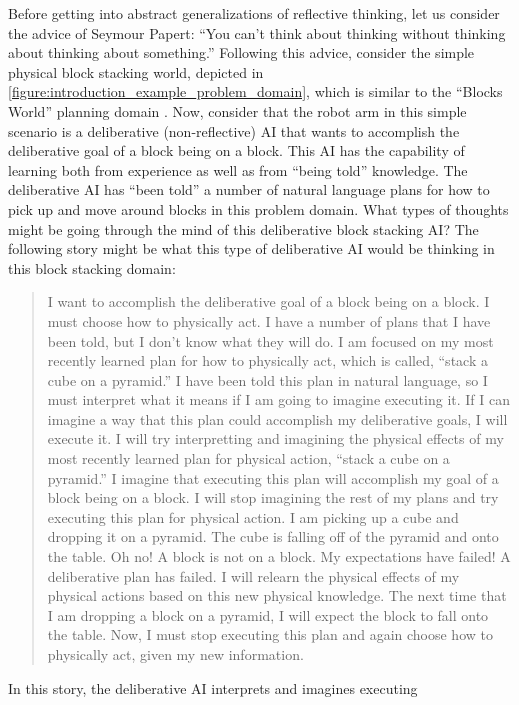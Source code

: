 Before getting into abstract generalizations of reflective thinking,
let us consider the advice of Seymour Papert: ``You can't think about
thinking without thinking about thinking about something.''  Following
this advice, consider the simple physical block stacking world,
depicted in {\autoref{figure:introduction_example_problem_domain}},
which is similar to the ``Blocks World'' planning domain
{\cite[]{winograd:1970}}.  Now, consider that the robot arm in this
simple scenario is a deliberative (non-reflective) AI that wants to
accomplish the deliberative goal of a block being on a block.  This AI
has the capability of learning both from experience as well as from
``being told'' knowledge.  The deliberative AI has ``been told'' a
number of natural language plans for how to pick up and move around
blocks in this problem domain.  What types of thoughts might be going
through the mind of this deliberative block stacking AI?  The
following story might be what this type of deliberative AI would be
thinking in this block stacking domain:
\begin{quote}
  I want to accomplish the deliberative goal of a block being on a
  block.  I must choose how to physically act.  I have a number of
  plans that I have been told, but I don't know what they will do.  I
  am focused on my most recently learned plan for how to physically
  act, which is called, ``stack a cube on a pyramid.''  I have been
  told this plan in natural language, so I must interpret what it
  means if I am going to imagine executing it.  If I can imagine a way
  that this plan could accomplish my deliberative goals, I will
  execute it.  I will try interpretting and imagining the physical
  effects of my most recently learned plan for physical action,
  ``stack a cube on a pyramid.''  I imagine that executing this plan
  will accomplish my goal of a block being on a block.  I will stop
  imagining the rest of my plans and try executing this plan for
  physical action.  I am picking up a cube and dropping it on a
  pyramid.  The cube is falling off of the pyramid and onto the table.
  Oh no!  A block is not on a block.  My expectations have failed!  A
  deliberative plan has failed.  I will relearn the physical effects
  of my physical actions based on this new physical knowledge.  The
  next time that I am dropping a block on a pyramid, I will expect the
  block to fall onto the table.  Now, I must stop executing this plan
  and again choose how to physically act, given my new information.
\end{quote}
In this story, the deliberative AI interprets and imagines executing

